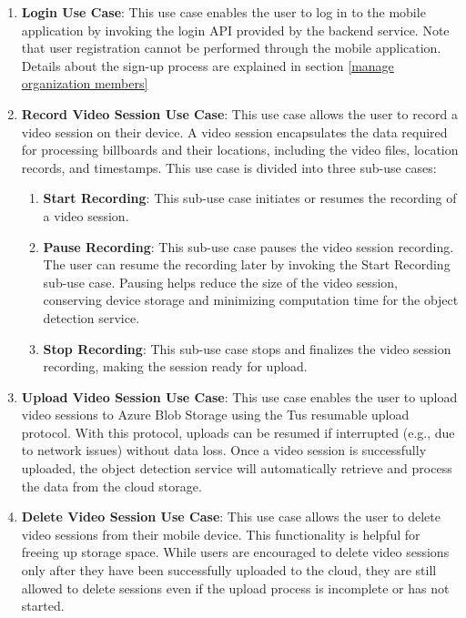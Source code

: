 \ifenglish
\begin{enumerate}
    \item \textbf{Login Use Case}: This use case enables the user to log in to the mobile application by invoking the login API provided by the backend service. Note that user registration cannot be performed through the mobile application. Details about the sign-up process are explained in section \ref{manage organization members}
    \item \textbf{Record Video Session Use Case}: This use case allows the user to record a video session on their device. A video session encapsulates the data required for processing billboards and their locations, including the video files, location records, and timestamps. This use case is divided into three sub-use cases:  
    \begin{enumerate}
        \item \textbf{Start Recording}: This sub-use case initiates or resumes the recording of a video session.  
        \item \textbf{Pause Recording}: This sub-use case pauses the video session recording. The user can resume the recording later by invoking the Start Recording sub-use case. Pausing helps reduce the size of the video session, conserving device storage and minimizing computation time for the object detection service.  
        \item \textbf{Stop Recording}: This sub-use case stops and finalizes the video session recording, making the session ready for upload.  
    \end{enumerate}
    \item \textbf{Upload Video Session Use Case}: This use case enables the user to upload video sessions to Azure Blob Storage using the Tus resumable upload protocol. With this protocol, uploads can be resumed if interrupted (e.g., due to network issues) without data loss. Once a video session is successfully uploaded, the object detection service will automatically retrieve and process the data from the cloud storage.  
    \item \textbf{Delete Video Session Use Case}: This use case allows the user to delete video sessions from their mobile device. This functionality is helpful for freeing up storage space. While users are encouraged to delete video sessions only after they have been successfully uploaded to the cloud, they are still allowed to delete sessions even if the upload process is incomplete or has not started.  
\end{enumerate}
